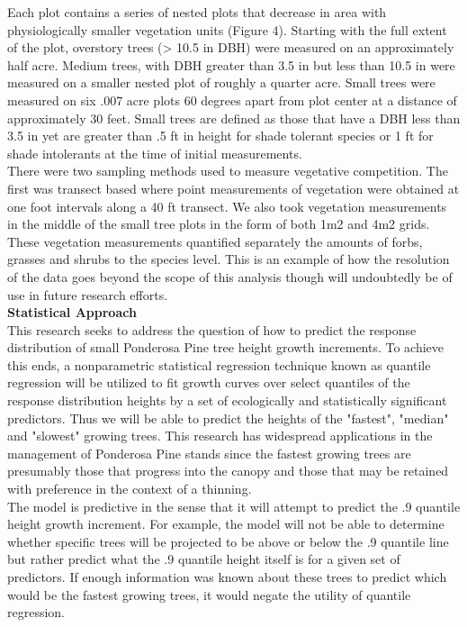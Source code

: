 \documentclass[10pt, letterpaper, fleqn]{article}
\begin{document}
Each plot contains a series of nested plots that decrease in area with physiologically smaller vegetation units (Figure 4). Starting with the full extent of the plot, overstory trees (> 10.5 in DBH) were measured on an approximately half acre. Medium trees, with DBH greater than 3.5 in but less than 10.5 in were measured on a smaller nested plot of roughly a quarter acre.
Small trees were measured on six .007 acre plots 60 degrees apart from plot center at a distance of approximately 30 feet.  Small trees are defined as those that have a DBH less than 3.5 in yet are greater than .5 ft in height for shade tolerant species or 1 ft for shade intolerants at the time of initial measurements.\\[2pt]

There were two sampling methods used to measure vegetative competition. The first was transect based where point measurements of vegetation were obtained at one foot intervals along a 40 ft transect.  We also took vegetation measurements in the middle of the small tree plots in the form of both 1m2 and 4m2 grids. These vegetation measurements quantified separately the amounts of forbs, grasses and shrubs to the species level.  This is an example of how the resolution of the data goes beyond the scope of this analysis though will undoubtedly be of use in future research efforts.\\[2pt]

\textbf{Statistical Approach}\\[1pt]

This research seeks to address the question of how to predict the response distribution of small Ponderosa Pine tree height growth increments.  To achieve this ends, a nonparametric statistical regression technique known as quantile regression will be utilized to fit growth curves over select quantiles of the response distribution heights by a set of ecologically and statistically significant predictors. Thus we will be able to predict the heights of the "fastest", "median" and "slowest" growing trees.
This research has widespread applications in the management of Ponderosa Pine stands since the fastest growing trees are
presumably those that progress into the canopy and those that may be retained with preference in the context of a thinning.\\[2pt]

The model is predictive in the sense that it will attempt to predict the .9 quantile height growth increment. For example, the model will not be able to determine whether specific trees will be projected to be above or below the .9 quantile line but rather predict what the .9 quantile height itself is for a given set of predictors. If enough information was known about these trees to predict which would be the fastest growing trees, it would negate the utility of quantile regression.\\[2pt]
\end{document}
